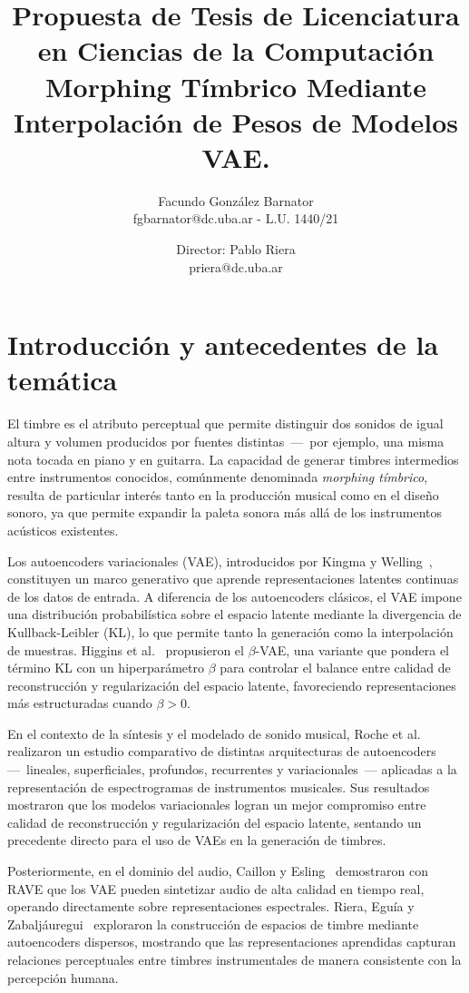 \documentclass[a4paper,11pt,titlepage]{article}
\title{Propuesta de Tesis de Licenciatura en Ciencias de la Computación\\ \Huge Morphing Tímbrico Mediante Interpolación de Pesos de Modelos VAE. \\ }
\author{Facundo González Barnator \\{\small fgbarnator@dc.uba.ar - L.U. 1440/21}}
\date{Director: Pablo Riera \\{\small priera@dc.uba.ar}}
\begin{document}
 \maketitle


\section*{Introducción y antecedentes de la temática}

El timbre es el atributo perceptual que permite distinguir dos sonidos de igual altura y
volumen producidos por fuentes distintas~---~por ejemplo, una misma nota tocada en piano y en
guitarra. La capacidad de generar timbres intermedios entre instrumentos conocidos,
comúnmente denominada \emph{morphing tímbrico}, resulta de particular interés tanto en
la producción musical como en el diseño sonoro, ya que permite expandir la paleta sonora
más allá de los instrumentos acústicos existentes.

Los autoencoders variacionales (VAE), introducidos por Kingma y Welling~\cite{kingma2013auto},
constituyen un marco generativo que aprende representaciones latentes continuas de los datos
de entrada. A diferencia de los autoencoders clásicos, el VAE impone una distribución
probabilística sobre el espacio latente mediante la divergencia de Kullback-Leibler (KL),
lo que permite tanto la generación como la interpolación de muestras. Higgins et al.~\cite{higgins2017beta}
propusieron el $\beta$-VAE, una variante que pondera el término KL con un hiperparámetro
$\beta$ para controlar el balance entre calidad de reconstrucción y regularización del espacio
latente, favoreciendo representaciones más estructuradas cuando $\beta > 0$.

En el contexto de la síntesis y el modelado de sonido musical, Roche et al.~\cite{roche2019autoencodersmusicsoundmodeling}
realizaron un estudio comparativo de distintas arquitecturas de autoencoders ---~lineales,
superficiales, profundos, recurrentes y variacionales~--- aplicadas a la representación
de espectrogramas de instrumentos musicales. Sus resultados mostraron que los modelos
variacionales logran un mejor compromiso entre calidad de reconstrucción y regularización
del espacio latente, sentando un precedente directo para el uso de VAEs en la generación
de timbres.

Posteriormente, en el dominio del audio, Caillon y Esling~\cite{caillon2021rave} demostraron con RAVE que
los VAE pueden sintetizar audio de alta calidad en tiempo real, operando directamente sobre
representaciones espectrales. Riera, Eguía y Zabaljáuregui~\cite{riera2017timbre} exploraron
la construcción de espacios de timbre mediante autoencoders dispersos, mostrando que las
representaciones aprendidas capturan relaciones perceptuales entre timbres instrumentales
de manera consistente con la percepción humana.
\end{document}
